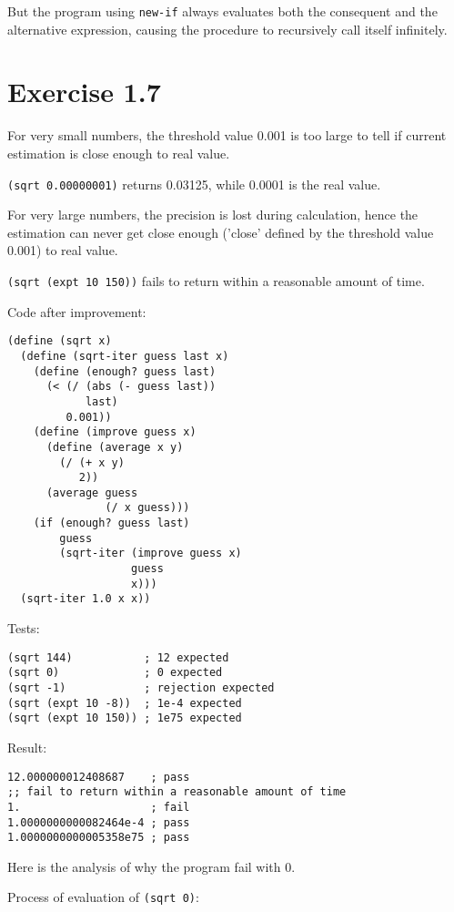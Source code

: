 \documentclass[../main.tex]{subfiles}
\begin{document}
But the program using \lstinline{new-if} always evaluates both the
 consequent and the alternative expression, causing the procedure to
 recursively call itself infinitely.

\section{Exercise 1.7}

For very small numbers, the threshold value 0.001 is too large to tell
 if current estimation is close enough to real value.

\lstinline{(sqrt 0.00000001)} returns 0.03125, while 0.0001 is the real value.

For very large numbers, the precision is lost during calculation, hence
 the estimation can never get close enough ('close' defined by the
 threshold value 0.001) to real value.

\lstinline{(sqrt (expt 10 150))} fails to return within a reasonable
 amount of time.

Code after improvement:

\begin{lstlisting}
(define (sqrt x)
  (define (sqrt-iter guess last x)
    (define (enough? guess last)
      (< (/ (abs (- guess last))
            last)
         0.001))
    (define (improve guess x)
      (define (average x y)
        (/ (+ x y)
           2))
      (average guess
               (/ x guess)))
    (if (enough? guess last)
        guess
        (sqrt-iter (improve guess x)
                   guess
                   x)))
  (sqrt-iter 1.0 x x))
\end{lstlisting}

Tests:

\begin{lstlisting}
(sqrt 144)           ; 12 expected
(sqrt 0)             ; 0 expected
(sqrt -1)            ; rejection expected
(sqrt (expt 10 -8))  ; 1e-4 expected
(sqrt (expt 10 150)) ; 1e75 expected
\end{lstlisting}

Result:

\begin{lstlisting}
12.000000012408687    ; pass
;; fail to return within a reasonable amount of time
1.                    ; fail
1.0000000000082464e-4 ; pass
1.0000000000005358e75 ; pass
\end{lstlisting}

Here is the analysis of why the program fail with 0.

Process of evaluation of \lstinline{(sqrt 0)}:
\end{document}
